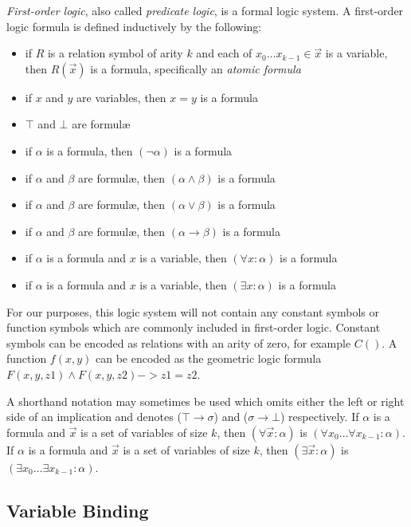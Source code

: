 		\emph{First-order logic}, also called \emph{predicate logic}, is a
		formal logic system. A first-order logic formula is defined inductively
		by the following:
		\begin{itemize}
		\item if $R$ is a relation symbol of arity $k$ and each of $x_0 \ldots x_{k-1} \in \vec{x}$ is a variable, then $R(\vec{x})$ is a formula, specifically an \emph{atomic formula}
		\item if $x$ and $y$ are variables, then $x = y$ is a formula
		\item $\top$ and $\bot$ are formul{\ae}
		\item if $\alpha$ is a formula, then $(\neg\alpha)$ is a formula
		\item if $\alpha$ and $\beta$ are formul{\ae}, then $(\alpha \wedge \beta)$ is a formula
		\item if $\alpha$ and $\beta$ are formul{\ae}, then $(\alpha \vee \beta)$ is a formula
		\item if $\alpha$ and $\beta$ are formul{\ae}, then $(\alpha \to \beta)$ is a formula
		\item if $\alpha$ is a formula and $x$ is a variable, then $(\forall x : \alpha)$ is a formula
		\item if $\alpha$ is a formula and $x$ is a variable, then $(\exists x : \alpha)$ is a formula
		\end{itemize}

		For our purposes, this logic system will not contain any constant
		symbols or function symbols which are commonly included in first-order
		logic. Constant symbols can be encoded as relations with an arity of
		zero, for example $C()$. A function $f(x,y)$ can be encoded as the
		geometric logic formula $F(x,y,z1) \wedge F(x,y,z2) -> z1 = z2$.

		A shorthand notation may sometimes be used which omits either the left
		or right side of an implication and denotes ($\top \to \sigma$) and
		($\sigma \to \bot$) respectively. If $\alpha$ is a formula and
		$\vec{x}$ is a set of variables of size $k$, then $(\forall \vec{x} :
		\alpha)$ is $(\forall x_0 \ldots \forall x_{k-1} : \alpha)$. If
		$\alpha$ is a formula and $\vec{x}$ is a set of variables of size $k$,
		then $(\exists \vec{x} : \alpha)$ is $(\exists x_0 \ldots \exists
		x_{k-1} : \alpha)$.

	\subsection{Variable Binding}

